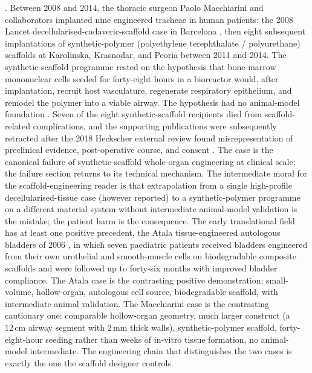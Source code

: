. Between
2008 and 2014, the thoracic surgeon Paolo Macchiarini and
collaborators implanted nine engineered tracheae in human patients:
the 2008 Lancet decellularised-cadaveric-scaffold case in Barcelona
\cite{paper:v6c05-macchiarini-2008-trachea}, then eight subsequent
implantations of synthetic-polymer (polyethylene terephthalate /
polyurethane) scaffolds at Karolinska, Krasnodar, and Peoria
between 2011 and 2014. The synthetic-scaffold programme rested on
the hypothesis that bone-marrow mononuclear cells seeded for
forty-eight hours in a bioreactor would, after implantation,
recruit host vasculature, regenerate respiratory epithelium, and
remodel the polymer into a viable airway. The hypothesis had no
animal-model foundation \cite{paper:v6c05-delaere-2014-thorax,
paper:v6c05-karolinska-heckscher-2018}. Seven of the eight
synthetic-scaffold recipients died from scaffold-related
complications, and the supporting publications were subsequently
retracted after the 2018 Heckscher external review found
misrepresentation of preclinical evidence, post-operative course,
and consent \cite{paper:v6c05-jungebluth-2011-lancet-retraction,
paper:v6c05-vogel-2017-science-investigation,
acc:macchiarini-trachea-2008-2014}. The case is the canonical
failure of synthetic-scaffold whole-organ engineering at clinical
scale; the failure section returns to its technical mechanism. The
intermediate moral for the scaffold-engineering reader is that
extrapolation from a single high-profile decellularised-tissue case
(however reported) to a synthetic-polymer programme on a different
material system without intermediate animal-model validation is the
mistake; the patient harm is the consequence. The early translational
field has at least one positive precedent, the Atala
tissue-engineered autologous bladders of 2006
\cite{paper:v6c05-atala-bladder-2006}, in which seven paediatric
patients received bladders engineered from their own urothelial
and smooth-muscle cells on biodegradable composite scaffolds and
were followed up to forty-six months with improved bladder
compliance. The Atala case is the contrasting positive demonstration:
small-volume, hollow-organ, autologous cell source, biodegradable
scaffold, with intermediate animal validation. The Macchiarini case
is the contrasting cautionary one: comparable hollow-organ geometry,
much larger construct (a $12\,\text{cm}$ airway segment with
$2\,\text{mm}$ thick walls), synthetic-polymer scaffold,
forty-eight-hour seeding rather than weeks of in-vitro tissue
formation, no animal-model intermediate. The engineering chain that
distinguishes the two cases is exactly the one the scaffold designer
controls.


